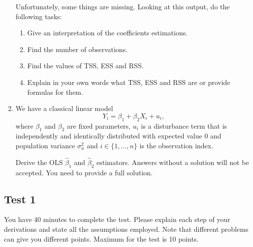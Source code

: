 \begin{enumerate}

Unfortunately, some things are missing. Looking at this output, do the following tasks:

\begin{enumerate}
    \item 
    Give an interpretation of the coefficients estimations.
    
    \item
    Find the number of observations.
    
    \item
    Find the values of TSS, ESS and RSS.
    
    \item
    Explain in your own words what TSS, ESS and RSS are or provide formulas for them.
\end{enumerate}


\item We have a classical linear model 
\[
    Y_i = \beta_1 + \beta_2 X_i + u_i,
\]
where $\beta_1$ and $\beta_2$ are fixed parameters, $u_i$ is a disturbance term that is independently and identically distributed with expected value 0 and population variance $\sigma_u^2$ 
and $i \in \{1, \ldots, n\}$ is the observation index.

Derive the OLS  $\hat \beta_1$ and $\hat \beta_2$ estimators. 
Answers without a solution will not be accepted. You need to provide a full solution.
\end{enumerate}



\subsection{Test 1}

You have 40 minutes to complete the test. Please explain each step of your derivations and state all the assumptions employed. 
Note that different problems can give you different points. Maximum for the test is 10 points.  


